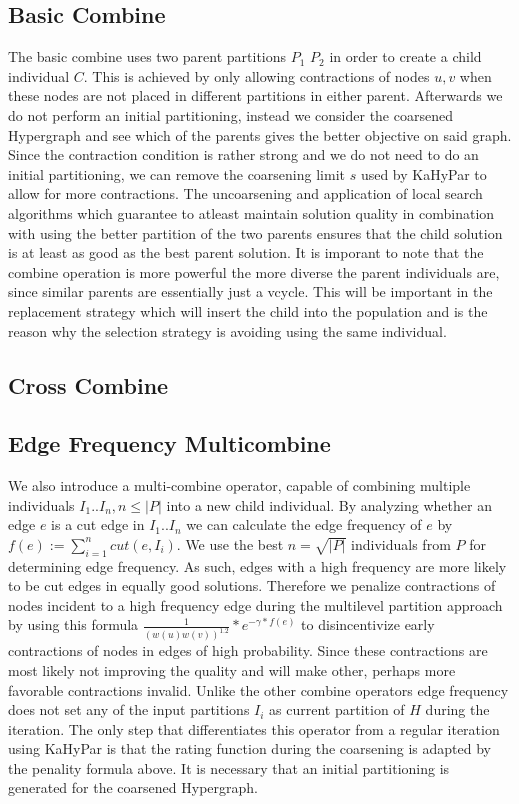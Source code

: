 \documentclass[a4paper,12pt,bibtotoc,titlepage, liststotoc,BCOR7mm,headsepline,pointlessnumbers]{scrbook}
\numberwithin{equation}{section}
\begin{document}
\subsection{Basic Combine}
The basic combine uses two parent partitions $P_1$ $P_2$ in order to create a child individual $C$. This is achieved by only allowing contractions of nodes $u, v$ when these nodes are not placed in different partitions in either parent. Afterwards we do not perform an initial partitioning, instead we consider the coarsened Hypergraph and see which of the parents gives the better objective on said graph. 
Since the contraction condition is rather strong and we do not need to do an initial partitioning, we can remove the coarsening limit $s$ used by KaHyPar
to allow for more contractions. The uncoarsening and application of local search algorithms which guarantee to atleast maintain solution quality in combination with using the better partition of the two parents ensures that the child solution is at least as good as the best parent solution. It is imporant to note that the combine operation is more powerful the more diverse the parent individuals are, since similar parents are essentially just a vcycle. This will be important in the replacement strategy which will insert the child into the population and is the reason why the selection strategy is avoiding using the same individual. 
\subsection{Cross Combine}

\subsection{Edge Frequency Multicombine}
We also introduce a multi-combine operator, capable of combining multiple individuals $I_1.. I_n, n \le |P|$ into a new child individual. By analyzing whether an edge $e$ is a cut edge in $I_1 ..I_n$ we can calculate the edge frequency of $e$ by $f(e) := \sum_{i=1}^n cut(e,I_i)$. We use the best $n = \sqrt{|P|}$ individuals from $P$ for determining edge frequency. As such, edges with a high frequency are more likely to be cut edges in equally good solutions. Therefore we penalize contractions of nodes incident to a high frequency edge during the multilevel partition approach by using this formula $\frac{1}{(w(u)w(v))^{1.2}}*e^{-\gamma*f(e)}$ to disincentivize early contractions of nodes in edges of high probability. Since these contractions are most likely not improving the quality and will make other, perhaps more favorable contractions invalid. Unlike the other combine operators edge frequency does not set any of the input partitions $I_i$ as current partition of $H$ during the iteration. The only step that differentiates this operator from a regular iteration using KaHyPar is that the rating function during the coarsening is adapted by the penality formula above. It is necessary that an initial partitioning is generated for the coarsened Hypergraph.
\end{document}

